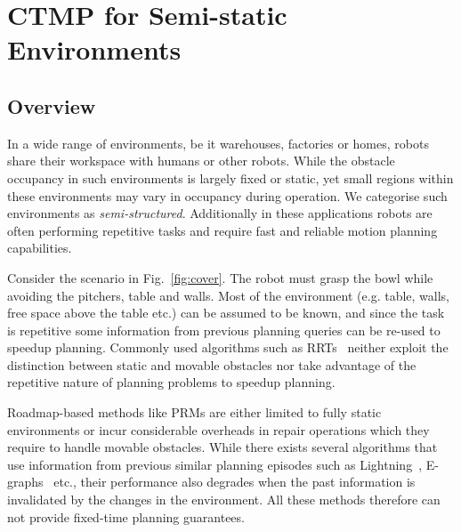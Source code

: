 \documentclass[a4paper]{report}
\begin{document}
\newpage
\chapter{CTMP for Semi-static Environments}
\label{sec:icra}
\section{Overview}
In a wide range of environments, be it warehouses, factories or homes, robots share their workspace with humans or other robots. While the obstacle occupancy in such environments is largely fixed or static, yet small regions within these environments may vary in occupancy during operation. We categorise such environments as \emph{semi-structured}. Additionally in these applications robots are often performing repetitive tasks and require fast and reliable motion planning capabilities.

Consider the scenario in Fig.~\ref{fig:cover}. The robot must grasp the bowl while avoiding the pitchers, table and walls.
Most of the environment (e.g. table, walls, free space above the table etc.) can be assumed to be known, and since the task is repetitive some information from previous planning queries can be re-used to speedup planning.
Commonly used algorithms such as RRTs~\cite{kuffner2000rrt} neither exploit the distinction between static and movable obstacles nor take advantage of the repetitive nature of planning problems to speedup planning. 

Roadmap-based methods like PRMs are either limited to fully static environments or incur considerable overheads in repair operations which they require to handle movable obstacles. While there exists several algorithms that use information from previous similar planning episodes such as Lightning~\cite{berenson2012robot}, E-graphs~\cite{Phillips-RSS-12} etc., their performance also degrades when the past information is invalidated by the changes in the environment. All these methods therefore can not provide fixed-time planning guarantees. 
\end{document}
